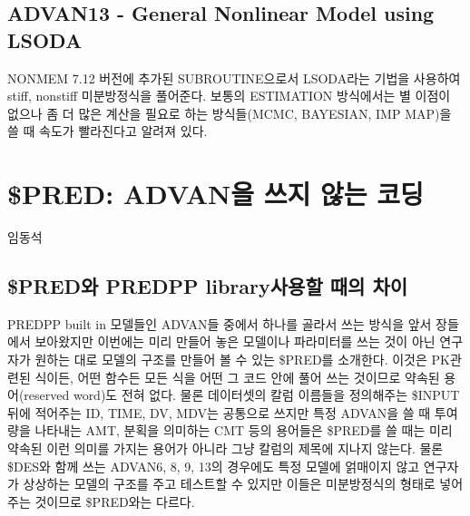 \documentclass[
  11pt,
  krantz2,
  a4paper]{krantz}
\theoremstyle{definition}
\theoremstyle{definition}
\theoremstyle{definition}
\theoremstyle{remark}
\begin{document}
\hypertarget{advan13---general-nonlinear-model-using-lsoda}{%
\section{ADVAN13 - General Nonlinear Model using LSODA}\label{advan13---general-nonlinear-model-using-lsoda}}


NONMEM 7.12 버전에 추가된 SUBROUTINE으로서 LSODA라는 기법을 사용하여 stiff, nonstiff 미분방정식을 풀어준다. 보통의 ESTIMATION 방식에서는 별 이점이 없으나 좀 더 많은 계산을 필요로 하는 방식들(MCMC, BAYESIAN, IMP MAP)을 쓸 때 속도가 빨라진다고 알려져 있다.

\hypertarget{PRED}{%
\chapter{\$PRED: ADVAN을 쓰지 않는 코딩}\label{PRED}}


\Large\hfill

임동석
\normalsize

\hypertarget{preduxc640-predpp-libraryuxc0acuxc6a9uxd560-uxb54cuxc758-uxcc28uxc774}{%
\section{\$PRED와 PREDPP library사용할 때의 차이}\label{preduxc640-predpp-libraryuxc0acuxc6a9uxd560-uxb54cuxc758-uxcc28uxc774}}


PREDPP built in 모델들인 ADVAN들 중에서 하나를 골라서 쓰는 방식을 앞서 장들에서 보아왔지만 이번에는 미리 만들어 놓은 모델이나 파라미터를 쓰는 것이 아닌 연구자가 원하는 대로 모델의 구조를 만들어 볼 수 있는 \$PRED를 소개한다. 이것은 PK관련된 식이든, 어떤 함수든 모든 식을 어떤 그 코드 안에 풀어 쓰는 것이므로 약속된 용어(reserved word)도 전혀 없다. 물론 데이터셋의 칼럼 이름들을 정의해주는 \$INPUT 뒤에 적어주는 ID, TIME, DV, MDV는 공통으로 쓰지만 특정 ADVAN을 쓸 때 투여량을 나타내는 AMT, 분획을 의미하는 CMT 등의 용어들은 \$PRED를 쓸 때는 미리 약속된 이런 의미를 가지는 용어가 아니라 그냥 칼럼의 제목에 지나지 않는다. 물론 \$DES와 함께 쓰는 ADVAN6, 8, 9, 13의 경우에도 특정 모델에 얽매이지 않고 연구자가 상상하는 모델의 구조를 주고 테스트할 수 있지만 이들은 미분방정식의 형태로 넣어주는 것이므로 \$PRED와는 다르다.
\end{document}
